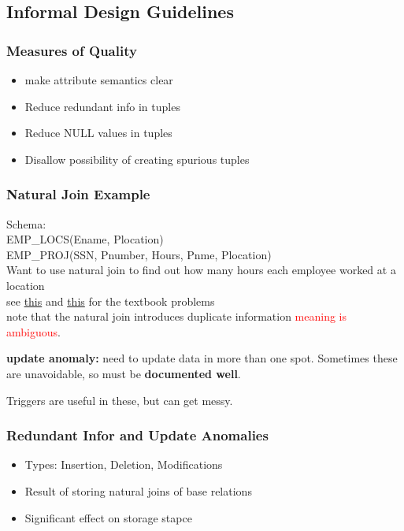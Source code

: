 \documentclass[12pt]{article}
\begin{document}
\subsection{Informal Design Guidelines}
\subsubsection{Measures of Quality}
\begin{itemize}
  \item make attribute semantics clear
  \item Reduce redundant info in tuples
  \item Reduce NULL values in tuples
  \item Disallow possibility of creating spurious tuples
\end{itemize}

\subsubsection{Natural Join Example}
Schema:\\
EMP\_LOCS(Ename, Plocation)\\
EMP\_PROJ(SSN, Pnumber, Hours, Pnme, Plocation)\\
Want to use natural join to find out how many hours each employee worked at a
location\\
see
\href{http://cise.ufl.edu/class/cis4301sp14/slides/natural_join0.jpg}{this} and
\href{http://cise.ufl.edu/class/cis4301sp14/slides/natural_join0.jpg}{this}
for the textbook problems\\
note that the natural join introduces duplicate information
\textcolor{red}{meaning is ambiguous}.

\textbf{update anomaly:} need to update data in more than one spot. Sometimes
these are unavoidable, so must be \textbf{documented well}.

Triggers are useful in these, but can get messy.

\subsubsection{Redundant Infor and Update Anomalies}
\begin{itemize}
  \item {Types: Insertion, Deletion, Modifications}
  \item {Result of storing natural joins of base relations}
  \item {Significant effect on storage stapce}
\end{itemize}
\end{document}
